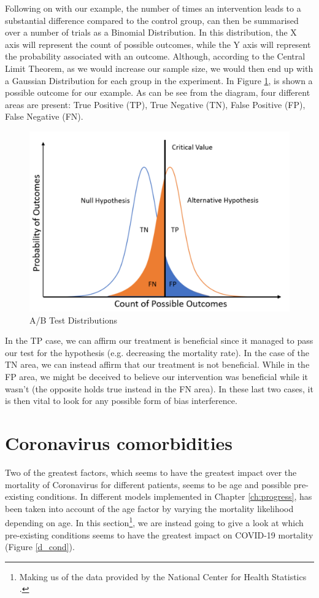 Following on with our example, the number of times an intervention leads to a substantial difference compared to the control group, can then be summarised over a number of trials as a Binomial Distribution. In this distribution, the X axis will represent the count of possible outcomes, while the Y axis will represent the probability associated with an outcome. Although, according to the Central Limit Theorem, as we would increase our sample size, we would then end up with a Gaussian Distribution for each group in the experiment. In Figure \ref{test_dist}, is shown a possible outcome for our example. As can be see from the diagram, four different areas are present: True Positive (TP), True Negative (TN), False Positive (FP), False Negative (FN).
\vspace{-0.2cm}
\begin{figure}[ht!]%
    \centering
    \includegraphics[width=0.6\linewidth]{latex/images/abtest.pdf}
    \vspace{-0.2cm}
    \caption{A/B Test Distributions}
    \label{test_dist}
\end{figure}
\vspace{-0.6cm}

In the TP case, we can affirm our treatment is beneficial since it managed to pass our test for the hypothesis (e.g. decreasing the mortality rate). In the case of the TN area, we can instead affirm that our treatment is not beneficial. While in the FP area, we might be deceived to believe our intervention was beneficial while it wasn't (the opposite holds true instead in the FN area). In these last two cases, it is then vital to look for any possible form of bias interference.

\section{Coronavirus comorbidities}

Two of the greatest factors, which seems to have the greatest impact over the mortality of Coronavirus for different patients, seems to be age and possible pre-existing conditions. In different models implemented in Chapter \ref{ch:progress}, has been taken into account of the age factor by varying the mortality likelihood depending on age. In this section\footnote{Making us of the data provided by the National Center for Health Statistics \cite{deaths_data}.}, we are instead going to give a look at which pre-existing conditions seems to have the greatest impact on COVID-19 mortality (Figure \ref{d_cond}). 

